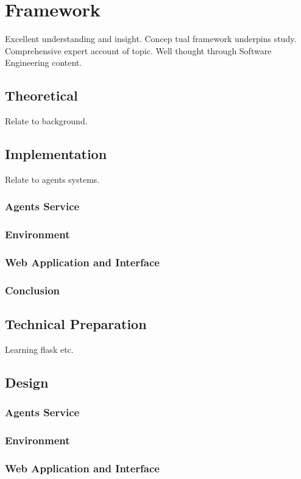 \documentclass[]{final_report}
\begin{document}
\chapter{Framework}
 Excellent understanding and insight. Concep
 tual framework underpins study. Comprehensive
 expert account of topic. Well thought through Software Engineering content.

\section{Theoretical}
Relate to background.

\section{Implementation}
Relate to agents systems.
\subsection{Agents Service}
\subsection{Environment}
\subsection{Web Application and Interface}
\subsection{Conclusion}

\section{Technical Preparation}
Learning flask etc.

\section{Design}

\subsection{Agents Service}
\subsection{Environment}
\subsection{Web Application and Interface}
\end{document}
